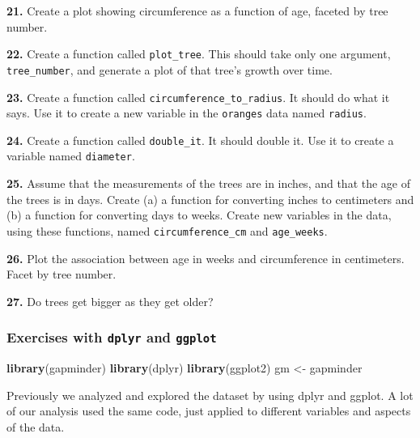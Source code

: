 \documentclass[]{book}
\newenvironment{Shaded}{\begin{snugshade}}{\end{snugshade}}
\newcommand{\KeywordTok}[1]{\textcolor[rgb]{0.13,0.29,0.53}{\textbf{#1}}}
\newcommand{\NormalTok}[1]{#1}
\newcommand{\StringTok}[1]{\textcolor[rgb]{0.31,0.60,0.02}{#1}}
\begin{document}
\textbf{21.} Create a plot showing circumference as a function of age, faceted by tree number.

\textbf{22.} Create a function called \texttt{plot\_tree}. This should take only one argument, \texttt{tree\_number}, and generate a plot of that tree's growth over time.

\textbf{23.} Create a function called \texttt{circumference\_to\_radius}. It should do what it says. Use it to create a new variable in the \texttt{oranges} data named \texttt{radius}.

\textbf{24.} Create a function called \texttt{double\_it}. It should double it. Use it to create a variable named \texttt{diameter}.

\textbf{25.} Assume that the measurements of the trees are in inches, and that the age of the trees is in days. Create (a) a function for converting inches to centimeters and (b) a function for converting days to weeks. Create new variables in the data, using these functions, named \texttt{circumference\_cm} and \texttt{age\_weeks}.

\textbf{26.} Plot the association between age in weeks and circumference in centimeters. Facet by tree number.

\textbf{27.} Do trees get bigger as they get older?

\hypertarget{exercises-with-dplyr-and-ggplot}{%
\subsubsection*{\texorpdfstring{Exercises with \texttt{dplyr} and \texttt{ggplot}}{Exercises with dplyr and ggplot}}\label{exercises-with-dplyr-and-ggplot}}

\begin{Shaded}
\begin{Highlighting}[]
\KeywordTok{library}\NormalTok{(gapminder)}
\KeywordTok{library}\NormalTok{(dplyr)}
\KeywordTok{library}\NormalTok{(ggplot2)}
\NormalTok{gm <-}\StringTok{ }\NormalTok{gapminder}
\end{Highlighting}
\end{Shaded}

Previously we analyzed and explored the dataset by using dplyr and ggplot. A lot of our analysis used the same code, just applied to different variables and aspects of the data.
\end{document}

